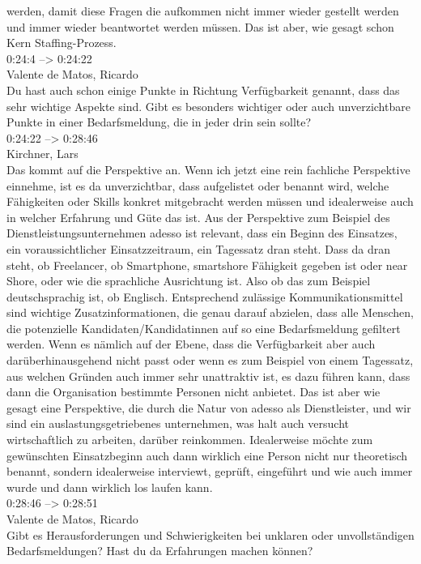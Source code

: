 werden, damit diese Fragen die aufkommen nicht immer wieder gestellt werden und immer wieder beantwortet werden müssen. Das ist aber, wie gesagt schon Kern Staffing-Prozess.\\

0:24:4 --> 0:24:22\\
Valente de Matos, Ricardo\\
Du hast auch schon einige Punkte in Richtung Verfügbarkeit genannt, dass das sehr wichtige Aspekte sind. Gibt es besonders wichtiger oder auch unverzichtbare Punkte in einer Bedarfsmeldung, die in jeder drin sein sollte?\\

0:24:22 --> 0:28:46\\
Kirchner, Lars\\
Das kommt auf die Perspektive an. Wenn ich jetzt eine rein fachliche Perspektive einnehme, ist es da unverzichtbar, dass aufgelistet oder benannt wird, welche Fähigkeiten oder Skills konkret mitgebracht werden müssen und idealerweise auch in welcher Erfahrung und Güte das ist. Aus der Perspektive zum Beispiel des Dienstleistungsunternehmen adesso ist relevant, dass ein Beginn des Einsatzes, ein voraussichtlicher Einsatzzeitraum, ein Tagessatz dran steht. Dass da dran steht, ob Freelancer, ob Smartphone, smartshore Fähigkeit gegeben ist oder near Shore, oder wie die sprachliche Ausrichtung ist. Also ob das zum Beispiel deutschsprachig ist, ob Englisch. Entsprechend zulässige Kommunikationsmittel sind wichtige Zusatzinformationen, die genau darauf abzielen, dass alle Menschen, die potenzielle Kandidaten/Kandidatinnen auf so eine Bedarfsmeldung gefiltert werden. Wenn es nämlich auf der Ebene, dass die Verfügbarkeit aber auch darüberhinausgehend nicht passt oder wenn es zum Beispiel von einem Tagessatz, aus welchen Gründen auch immer sehr unattraktiv ist, es dazu führen kann, dass dann die Organisation bestimmte Personen nicht anbietet. Das ist aber wie gesagt eine Perspektive, die durch die Natur von adesso als Dienstleister, und wir sind ein auslastungsgetriebenes unternehmen, was halt auch versucht wirtschaftlich zu arbeiten, darüber reinkommen. Idealerweise möchte zum gewünschten Einsatzbeginn auch dann wirklich eine Person nicht nur theoretisch benannt, sondern idealerweise interviewt, geprüft, eingeführt und wie auch immer wurde und dann wirklich los laufen kann.\\

0:28:46 --> 0:28:51\\
Valente de Matos, Ricardo\\
Gibt es Herausforderungen und Schwierigkeiten bei unklaren oder unvollständigen Bedarfsmeldungen? Hast du da Erfahrungen machen können?\\

